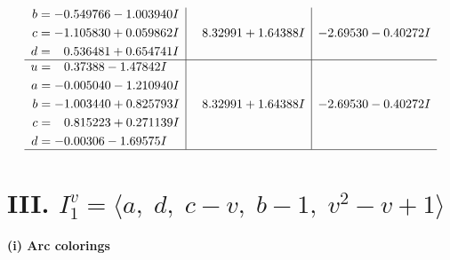 \documentclass[1p]{elsarticle_modified}
\theoremstyle{definition}
\begin{document}
$$\begin{array}{c|c|c}
\begin{aligned}
b &= -0.549766 - 1.003940 I \\
c &= -1.105830 + 0.059862 I \\
d &= \phantom{-}0.536481 + 0.654741 I\end{aligned}
 & \phantom{-}8.32991 + 1.64388 I & -2.69530 - 0.40272 I \\ \hline\begin{aligned}
u &= \phantom{-}0.37388 - 1.47842 I \\
a &= -0.005040 - 1.210940 I \\
b &= -1.003440 + 0.825793 I \\
c &= \phantom{-}0.815223 + 0.271139 I \\
d &= -0.00306 - 1.69575 I\end{aligned}
 & \phantom{-}8.32991 + 1.64388 I & -2.69530 - 0.40272 I\\
 \hline 
 \end{array}$$\newpage\newpage\renewcommand{\arraystretch}{1}
\centering \section*{III. $I^v_{1}= \langle a,\;d,\;c- v,\;b-1,\;v^2- v+1 \rangle$}
\flushleft \textbf{(i) Arc colorings}\\
\end{document}
